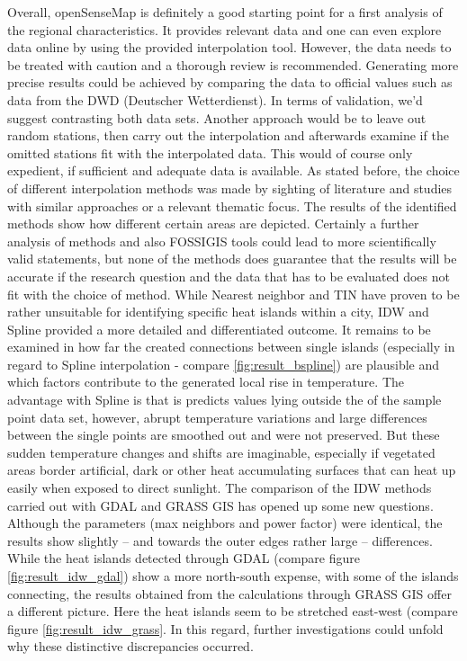 Overall, openSenseMap is definitely a good starting point for a first analysis of the regional characteristics. It provides relevant data and one can even explore data online by using the provided interpolation tool. However, the data needs to be treated with caution and a thorough review is recommended. Generating more precise results could be achieved by comparing the data to official values such as data from the DWD (Deutscher Wetterdienst).  
In terms of validation, we'd suggest contrasting both data sets. Another approach would be to leave out random stations, then carry out the interpolation and afterwards examine if the omitted stations fit with the interpolated data. This would of course only expedient, if sufficient and adequate data is available. 
As stated before, the choice of different interpolation methods was made by sighting of literature and studies with similar approaches or a relevant thematic focus. The results of the identified methods show how different certain areas are depicted. Certainly a further analysis of methods and also FOSSIGIS tools could lead to more scientifically valid statements, but none of the methods does guarantee that the results will be accurate if the research question and the data that has to be evaluated does not \ldq{}fit\rdq{} with the choice of method. 
While Nearest neighbor and TIN have proven to be rather unsuitable for identifying specific heat islands within a city, IDW and Spline provided a more detailed and differentiated outcome. It remains to be examined in how far the created connections between single \ldq{}islands\rdq{} (especially in regard to Spline interpolation - compare \ref{fig:result_bspline}) are plausible and which factors contribute to the generated local rise in temperature. The advantage with Spline is that is predicts values lying outside the of the sample point data set, however, abrupt temperature variations and large differences between the single points are smoothed out and were not preserved. But these sudden temperature changes and shifts are imaginable, especially if vegetated areas border artificial, dark or other heat accumulating surfaces that can heat up easily when exposed to direct sunlight. 
The comparison of the IDW methods carried out with GDAL and GRASS GIS has opened up some new questions. Although the parameters (max neighbors and power factor) were identical, the results show slightly – and towards the outer edges rather large – differences. While the \ldq{}heat islands\rdq{} detected through GDAL (compare figure \ref{fig:result_idw_gdal}) show a more north-south expense, with some of the islands connecting, the results obtained from the calculations through GRASS GIS offer a different picture. Here the \ldq{}heat islands\rdq{} seem to be stretched east-west (compare figure \ref{fig:result_idw_grass}. In this regard, further investigations could unfold why these distinctive discrepancies occurred. 


